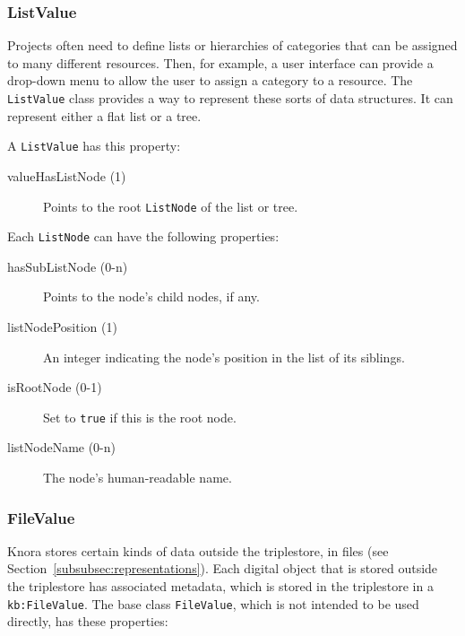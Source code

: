 \documentclass[12pt, a4paper]{article}
\begin{document}
\subsubsection{ListValue}

Projects often need to define lists or hierarchies of categories that can be assigned to many different resources. Then, for example, a user interface can provide a drop-down menu to allow the user to assign a category to a resource. The \texttt{ListValue} class provides a way to represent these sorts of data structures. It can represent either a flat list or a tree.

A \texttt{ListValue} has this property:

\begin{description}
	\item[valueHasListNode (1)] Points to the root \texttt{ListNode} of the list or tree.
\end{description}

Each \texttt{ListNode} can have the following properties:

\begin{description}
	\item[hasSubListNode (0-n)] Points to the node's child nodes, if any.
	\item[listNodePosition (1)] An integer indicating the node's position in the list of its siblings.
	\item[isRootNode (0-1)] Set to \texttt{true} if this is the root node.
	\item[listNodeName (0-n)] The node's human-readable name.
\end{description}

\subsubsection{FileValue}

\label{subsubsec:filevalue}

Knora stores certain kinds of data outside the triplestore, in files (see Section~\ref{subsubsec:representations}). Each digital object that is stored outside the triplestore has associated metadata, which is stored in the triplestore in a \texttt{kb:FileValue}. The base class \texttt{FileValue}, which is not intended to be used directly, has these properties:
\end{document}
